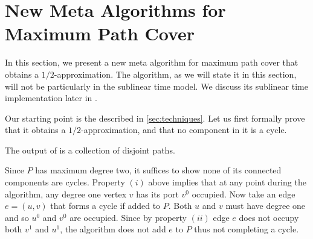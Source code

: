 \section{New Meta Algorithms for Maximum Path Cover}\label{sec:pathcover-algs}

In this section, we present a new meta algorithm for maximum path cover that obtains a $1/2$-approximation. The algorithm, as we will state it in this section, will not be particularly in the sublinear time model. We discuss its sublinear time implementation later in .

Our starting point is the \algone{} described in \cref{sec:techniques}. Let us first formally prove that it obtains a $1/2$-approximation, and that no component in it is a cycle.



\begin{claim}
    The output of \algone{} is a collection of disjoint paths.
\end{claim}
\begin{myproof}
    Since $P$ has maximum degree two, it suffices to show none of its connected components are cycles.  Property $(i)$  above implies that at any point during the algorithm, any degree one vertex $v$ has its port $v^0$ occupied. Now take an edge $e=(u, v)$ that forms a cycle if added to $P$. Both $u$ and $v$ must have degree one and so $u^0$ and $v^0$ are occupied. Since by property $(ii)$ edge $e$ does not occupy both $v^1$ and $u^1$, the algorithm does not add $e$ to $P$ thus not completing a cycle.
\end{myproof}

